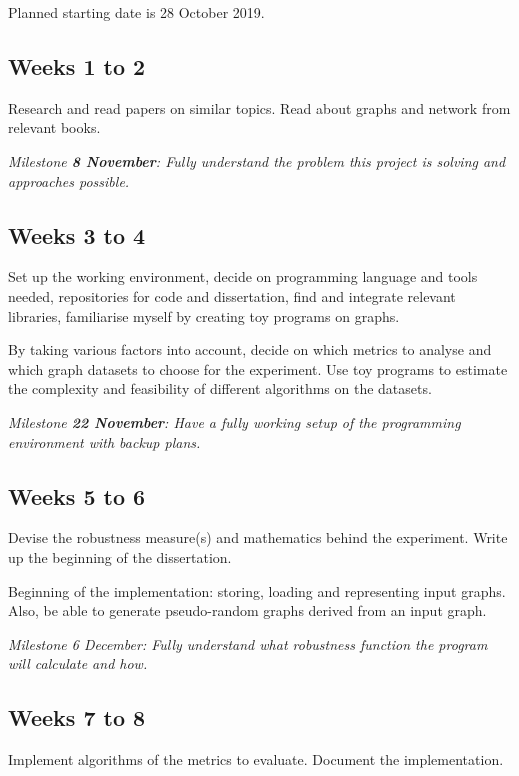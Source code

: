 \documentclass[12pt,a4paper,twoside]{article}
\begin{document}
	Planned starting date is 28 October 2019.
	
	\subsection*{Weeks 1 to 2}
	
		Research and read papers on similar topics. Read about graphs and network from relevant books.
		
		\textit{Milestone \textbf{8 November}: Fully understand the problem this project is solving and approaches possible.}
	
	\subsection*{Weeks 3 to 4}
	
	    Set up the working environment, decide on programming language and tools needed, repositories for code and dissertation, find and integrate relevant libraries, familiarise myself by creating toy programs on graphs.
	    
	    By taking various factors into account, decide on which metrics to analyse and which graph datasets to choose for the experiment. Use toy programs to estimate the complexity and feasibility of different algorithms on the datasets.
	    
	    \textit{Milestone \textbf{22 November}: Have a fully working setup of the programming environment with backup plans.}
		
	\subsection*{Weeks 5 to 6}
	
	    Devise the robustness measure(s) and mathematics behind the experiment. Write up the beginning of the dissertation.
	    
	    Beginning of the implementation: storing, loading and representing input graphs. Also, be able to generate pseudo-random graphs derived from an input graph.
	    
	    \textit{Milestone 6 December: Fully understand what robustness function the program will calculate and how.}
	
	\subsection*{Weeks 7 to 8}
	
	    Implement algorithms of the metrics to evaluate. Document the implementation.
	
\end{document}
